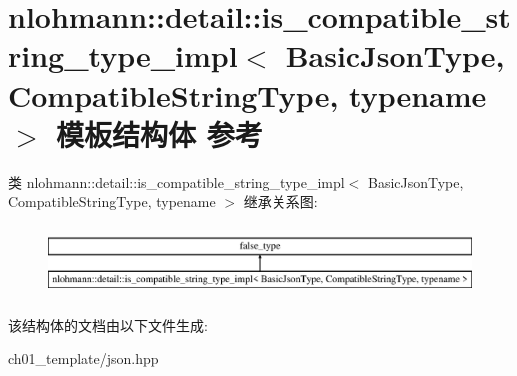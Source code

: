 \hypertarget{structnlohmann_1_1detail_1_1is__compatible__string__type__impl}{}\section{nlohmann\+::detail\+::is\+\_\+compatible\+\_\+string\+\_\+type\+\_\+impl$<$ Basic\+Json\+Type, Compatible\+String\+Type, typename $>$ 模板结构体 参考}
\label{structnlohmann_1_1detail_1_1is__compatible__string__type__impl}
类 nlohmann\+::detail\+::is\+\_\+compatible\+\_\+string\+\_\+type\+\_\+impl$<$ Basic\+Json\+Type, Compatible\+String\+Type, typename $>$ 继承关系图\+:\begin{figure}[H]
\begin{center}
\leavevmode
\includegraphics[height=1.882353cm]{structnlohmann_1_1detail_1_1is__compatible__string__type__impl}
\end{center}
\end{figure}


该结构体的文档由以下文件生成\+:\begin{DoxyCompactItemize}
\item 
ch01\+\_\+template/json.\+hpp\end{DoxyCompactItemize}
